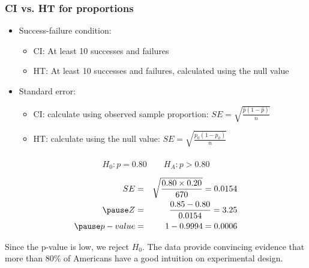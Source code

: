 \documentclass[slidestop,compress,mathserif]{beamer}
\begin{document}
\begin{frame}
\frametitle{CI vs. HT for proportions}

\begin{itemize}

\item Success-failure condition:
\begin{itemize}
\item CI: At least 10  successes and failures
\item HT: At least 10  successes and failures, calculated using the null value
\end{itemize}

\item Standard error:
\begin{itemize}
\item CI: calculate using observed sample proportion: $SE = \sqrt{\frac{\hat{p}(1-\hat{p})}{n}}$
\item HT: calculate using the null value: $SE = \sqrt{\frac{p_0(1-p_0)}{n}}$
\end{itemize}

\end{itemize}

\end{frame}


\begin{frame}
\frametitle{}


\pause 

\[ H_0: p = 0.80 \qquad H_A: p > 0.80 \]

{
\pause
\begin{eqnarray*}
SE &=& \sqrt{\frac{0.80 \times 0.20}{670}} = 0.0154 \\
\pause
Z &=& \frac{0.85 - 0.80}{0.0154} = 3.25 \\
\pause
p-value &=& 1 - 0.9994 = 0.0006 \\
\end{eqnarray*}
}
{
\begin{center}
\end{center}
}
\pause
Since the p-value is low, we reject $H_0$. The data provide convincing evidence that more than 80\% of Americans have a good intuition on experimental design.

\end{frame}
\end{document}
